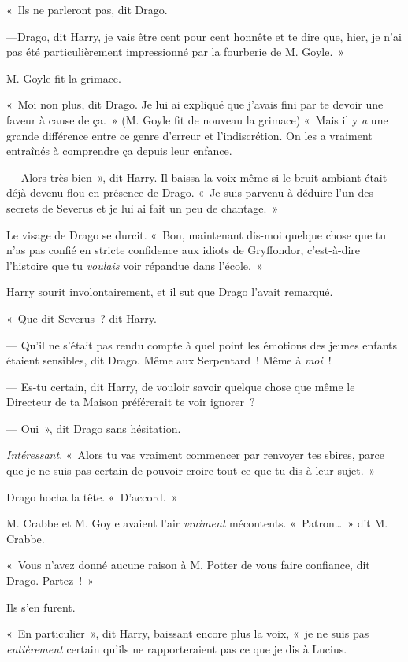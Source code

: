 «~Ils ne parleront pas, dit Drago.

---Drago, dit Harry, je vais être cent pour cent honnête et te dire que, hier, je n'ai pas été particulièrement impressionné par la fourberie de M. Goyle.~»

M. Goyle fit la grimace.

«~Moi non plus, dit Drago.
Je lui ai expliqué que j'avais fini par te devoir une faveur à cause de ça.~»
(M. Goyle fit de nouveau la grimace) «~Mais il y \emph{a} une grande différence entre ce genre d'erreur et l'indiscrétion.
On les a vraiment entraînés à comprendre ça depuis leur enfance.

--- Alors très bien~», dit Harry.
Il baissa la voix même si le bruit ambiant était déjà devenu flou en présence de Drago.
«~Je suis parvenu à déduire l'un des secrets de Severus et je lui ai fait un peu de chantage.~»

Le visage de Drago se durcit.
«~Bon, maintenant dis-moi quelque chose que tu n'as pas confié en stricte confidence aux idiots de Gryffondor, c'est-à-dire l'histoire que tu \emph{voulais} voir répandue dans l'école.~»

Harry sourit involontairement, et il sut que Drago l'avait remarqué.

«~Que dit Severus~? dit Harry.

--- Qu'il ne s'était pas rendu compte à quel point les émotions des jeunes enfants étaient sensibles, dit Drago.
Même aux Serpentard~!
Même à \emph{moi}~!

--- Es-tu certain, dit Harry, de vouloir savoir quelque chose que même le Directeur de ta Maison préférerait te voir ignorer~?

--- Oui~», dit Drago sans hésitation.

\emph{Intéressant}.
«~Alors tu vas vraiment commencer par renvoyer tes sbires, parce que je ne suis pas certain de pouvoir croire tout ce que tu dis à leur sujet.~»

Drago hocha la tête.
«~D'accord.~»

M. Crabbe et M. Goyle avaient l'air \emph{vraiment} mécontents.
«~Patron…~»
dit M. Crabbe.

«~Vous n'avez donné aucune raison à M. Potter de vous faire confiance, dit Drago.
Partez~!~»

Ils s'en furent.

«~En particulier~», dit Harry, baissant encore plus la voix, «~je ne suis pas \emph{entièrement} certain qu'ils ne rapporteraient pas ce que je dis à Lucius.


